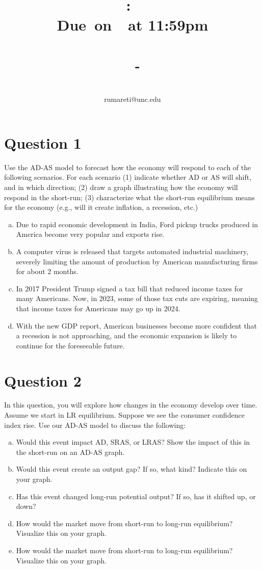 \documentclass{article}
\title{
    \vspace{2in}
    \textmd{\textbf{\hmwkClass:\ \hmwkTitle}}\\
    \normalsize\vspace{0.1in}\small{\textbf{Due\ on\ \hmwkDueDate\ at 11:59pm}}\\
    \normalsize\text{Tuesday/Thursday 3:30-4:45, Genome Sciences 100}\\
    \vspace{0.1in}\large{\textit{\hmwkClassInstructor\ - \hmwkClassTime}}
    \vspace{3in}
}
\author{\hmwkAuthorName\\\small{rumareti@unc.edu}}
\date{}
\newcommand{\question}[1]{\pagebreak\section{Question #1}}
\begin{document}
\maketitle

\question{1}

Use the AD-AS model to forecast how the economy will respond to
each of the following scenarios. For each scenario (1) indicate whether
AD or AS will shift, and in which direction; (2) draw a graph illustrating how the economy will respond in the short-run; (3) characterize
what the short-run equilibrium means for the economy (e.g., will it
create inflation, a recession, etc.)

\begin{enumerate}[(a)]
    \item Due to rapid economic development in India, Ford pickup trucks produced in America become very popular and exports rise.
    \item A computer virus is released that targets automated industrial machinery, severely limiting the amount of production by American manufacturing firms for about 2 months.
    \item In 2017 President Trump signed a tax bill that reduced income taxes for many Americans. Now, in 2023, some of those tax cuts are expiring, meaning that income taxes for Americans may go up in 2024.
    \item With the new GDP report, American businesses become more confident that a recession is not approaching, and the economic expansion is likely to continue for the foreseeable future.
\end{enumerate}

\pagebreak
\question{2}
In this question, you will explore how changes in the economy develop
over time. Assume we start in LR equilibrium. Suppose we see the
consumer confidence index rise. Use our AD-AS model to discuss the
following:

\begin{enumerate}[(a)]
    \item Would this event impact AD, SRAS, or LRAS? Show the impact of this in the short-run on an AD-AS graph.
    \item Would this event create an output gap? If so, what kind? Indicate this on your graph.
    \item Has this event changed long-run potential output? If so, has it shifted up, or down?
    \item How would the market move from short-run to long-run equilibrium? Visualize this on your graph.
    \item How would the market move from short-run to long-run equilibrium? Visualize this on your graph.
\end{enumerate}
\end{document}
